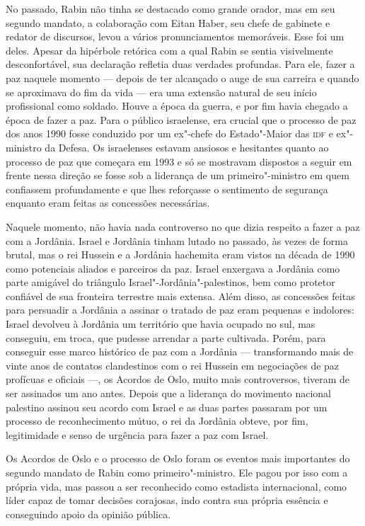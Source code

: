 No passado, Rabin não tinha se destacado como grande orador, mas em seu
segundo mandato, a colaboração com Eitan Haber, seu chefe de gabinete e
redator de discursos, levou a vários pronunciamentos memoráveis. Esse foi um
deles. Apesar da hipérbole retórica com a qual Rabin se sentia
visivelmente desconfortável, sua declaração refletia duas verdades
profundas. Para ele, fazer a paz naquele momento --- depois de ter
alcançado o auge de sua carreira e quando se aproximava do fim da vida
--- era uma extensão natural de seu início profissional como soldado.
Houve a época da guerra, e por fim havia chegado a época de fazer a paz.
Para o público israelense, era crucial que o processo de paz dos anos
1990 fosse conduzido por um ex"-chefe do Estado"-Maior das \textsc{idf} e
ex"-ministro da Defesa. Os israelenses estavam ansiosos e hesitantes
quanto ao processo de paz que começara em 1993 e só se mostravam
dispostos a seguir em frente nessa direção se fosse sob a liderança de
um primeiro"-ministro em quem confiassem profundamente e que lhes
reforçasse o sentimento de segurança enquanto eram feitas as concessões
necessárias.

Naquele momento, não havia nada controverso no que dizia respeito a
fazer a paz com a Jordânia. Israel e Jordânia tinham lutado no passado,
às vezes de forma brutal, mas o rei Hussein e a Jordânia hachemita eram
vistos na década de 1990 como potenciais aliados e parceiros da paz.
Israel enxergava a Jordânia como parte amigável do triângulo
Israel"-Jordânia"-palestinos, bem como protetor confiável de sua fronteira
terrestre mais extensa. Além disso, as concessões feitas para persuadir
a Jordânia a assinar o tratado de paz eram pequenas e indolores: Israel
devolveu à Jordânia um território que havia ocupado no sul, mas
conseguiu, em troca, que pudesse arrendar a parte cultivada. Porém, para
conseguir esse marco histórico de paz com a Jordânia --- transformando
mais de vinte anos de contatos clandestinos com o rei Hussein em
negociações de paz profícuas e oficiais ---, os Acordos de Oslo, muito
mais controversos, tiveram de ser assinados um ano antes. Depois que a
liderança do movimento nacional palestino assinou seu acordo com Israel
e as duas partes passaram por um processo de reconhecimento mútuo, o rei
da Jordânia obteve, por fim, legitimidade e senso de urgência para fazer a
paz com Israel.

Os Acordos de Oslo e o processo de Oslo foram os eventos mais
importantes do segundo mandato de Rabin como primeiro"-ministro. Ele
pagou por isso com a própria vida, mas passou a ser reconhecido como
estadista internacional, como líder capaz de tomar decisões corajosas,
indo contra sua própria essência e conseguindo apoio da opinião pública.

